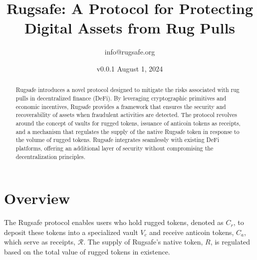 \documentclass{article}
\title{Rugsafe: A Protocol for Protecting Digital Assets from Rug Pulls}
\author{info@rugsafe.org}
\date{v0.0.1 August 1, 2024}
\begin{document}
\maketitle


\begin{abstract}
Rugsafe introduces a novel protocol designed to mitigate the risks associated with rug pulls in decentralized finance (DeFi). By leveraging cryptographic primitives and economic incentives, Rugsafe provides a framework that ensures the security and recoverability of assets when fraudulent activities are detected. The protocol revolves around the concept of vaults for rugged tokens, issuance of anticoin tokens as receipts, and a mechanism that regulates the supply of the native Rugsafe token in response to the volume of rugged tokens. Rugsafe integrates seamlessly with existing DeFi platforms, offering an additional layer of security without compromising the decentralization principles.
\end{abstract}











\section{Overview}

The Rugsafe protocol enables users who hold rugged tokens, denoted as $C_r$, to deposit these tokens into a specialized vault $V_c$ and receive anticoin tokens, $C_a$,  which serve as receipts, \(\mathcal{R} \). The supply of Rugsafe's native token, $R$, is regulated based on the total value of rugged tokens in existence.
\end{document}
